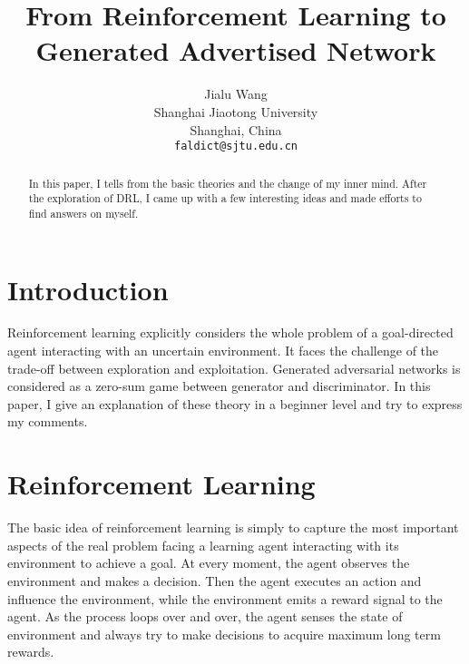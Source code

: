 \documentclass[10pt,twocolumn,letterpaper]{article}
\begin{document}
\title{From Reinforcement Learning to Generated Advertised Network}

\author{Jialu Wang\\
Shanghai Jiaotong University\\
Shanghai, China\\
{\tt\small faldict@sjtu.edu.cn}
}

\maketitle

\begin{abstract}
	In this paper, I tells from the basic theories and the change of my inner mind.
	After the exploration of DRL, I came up with a few interesting ideas and made
	efforts to find answers on myself.
\end{abstract}

\section{Introduction}

Reinforcement learning explicitly considers the whole problem of a goal-directed agent interacting
with an uncertain environment. It faces the challenge of the trade-off between exploration and exploitation.
Generated adversarial networks is considered as a zero-sum game between generator and discriminator.  
In this paper, I give an explanation of these theory in a beginner level and try to express my comments.

\section{Reinforcement Learning}

The basic idea of reinforcement learning is simply to capture the most important aspects of the real problem
facing a learning agent interacting with its environment to achieve a goal. At every moment, the agent observes the 
environment and makes a decision. Then the agent executes an action and influence the environment, while the
environment emits a reward signal to the agent.  As the process loops over and over, the agent senses the state of environment and always try to
make decisions to acquire maximum long term rewards.
\end{document}
